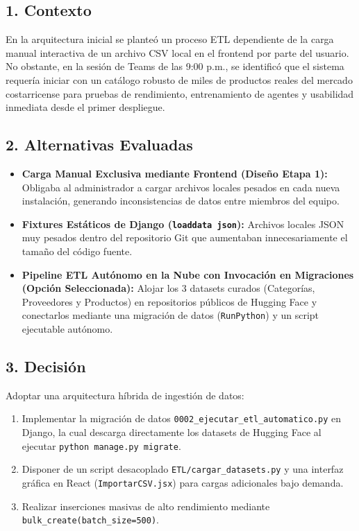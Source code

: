\documentclass[11pt,a4paper]{article}
\begin{document}
\subsection{1. Contexto}
En la arquitectura inicial se planteó un proceso ETL dependiente de la carga manual interactiva de un archivo CSV local en el frontend por parte del usuario. No obstante, en la sesión de Teams de las 9:00 p.m., se identificó que el sistema requería iniciar con un catálogo robusto de miles de productos reales del mercado costarricense para pruebas de rendimiento, entrenamiento de agentes y usabilidad inmediata desde el primer despliegue.

\subsection{2. Alternativas Evaluadas}
\begin{itemize}[leftmargin=*]
    \item \textbf{Carga Manual Exclusiva mediante Frontend (Diseño Etapa 1):} Obligaba al administrador a cargar archivos locales pesados en cada nueva instalación, generando inconsistencias de datos entre miembros del equipo.
    \item \textbf{Fixtures Estáticos de Django (\texttt{loaddata json}):} Archivos locales JSON muy pesados dentro del repositorio Git que aumentaban innecesariamente el tamaño del código fuente.
    \item \textbf{Pipeline ETL Autónomo en la Nube con Invocación en Migraciones (Opción Seleccionada):} Alojar los 3 datasets curados (Categorías, Proveedores y Productos) en repositorios públicos de Hugging Face y conectarlos mediante una migración de datos (\texttt{RunPython}) y un script ejecutable autónomo.
\end{itemize}

\subsection{3. Decisión}
Adoptar una arquitectura híbrida de ingestión de datos:
\begin{enumerate}
    \item Implementar la migración de datos \texttt{0002\_ejecutar\_etl\_automatico.py} en Django, la cual descarga directamente los datasets de Hugging Face al ejecutar \texttt{python manage.py migrate}.
    \item Disponer de un script desacoplado \texttt{ETL/cargar\_datasets.py} y una interfaz gráfica en React (\texttt{ImportarCSV.jsx}) para cargas adicionales bajo demanda.
    \item Realizar inserciones masivas de alto rendimiento mediante \texttt{bulk\_create(batch\_size=500)}.
\end{enumerate}
\end{document}
